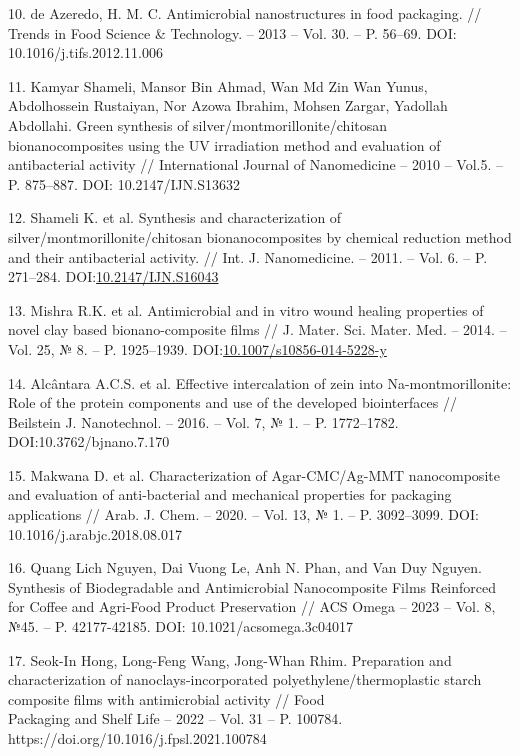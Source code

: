 \begin{references}
10. de Azeredo, H. M. C. Antimicrobial nanostructures in food packaging.
// Trends in Food Science \& Technology. -- 2013 -- Vol. 30. -- P.
56--69. DOI: 10.1016/j.tifs.2012.11.006

11. Kamyar Shameli, Mansor Bin Ahmad, Wan Md Zin Wan Yunus, Abdolhossein
Rustaiyan, Nor Azowa Ibrahim, Mohsen Zargar, Yadollah Abdollahi. Green
synthesis of silver/montmorillonite/chitosan \\bionanocomposites using
the UV irradiation method and evaluation of antibacterial activity //
International Journal of Nanomedicine -- 2010 -- Vol.5. -- P.
875--887. DOI: 10.2147/IJN.S13632

12. Shameli K. et al. Synthesis and characterization of
silver/montmorillonite/chitosan bionanocomposites by chemical
reduction method and their antibacterial activity. // Int. J.
Nanomedicine. -- 2011. -- Vol. 6. -- P. 271--284.
DOI:\href{http://dx.doi.org/10.2147/IJN.S16043}{10.2147/IJN.S16043}

13. Mishra R.K. et al. Antimicrobial and in vitro wound healing properties
of novel clay based bionano-composite films // J. Mater. Sci. Mater.
Med. -- 2014. -- Vol. 25, № 8. -- P. 1925--1939.
DOI:\href{http://dx.doi.org/10.1007/s10856-014-5228-y}{10.1007/s10856-014-5228-y}

14. Alcântara A.C.S. et al. Effective intercalation of zein into
Na-montmorillonite: Role of the protein components and use of the
developed biointerfaces // Beilstein J. Nanotechnol. -- 2016. -- Vol.
7, № 1. -- P. 1772--1782. DOI:10.3762/bjnano.7.170

15. Makwana D. et al. Characterization of Agar-CMC/Ag-MMT nanocomposite
and evaluation of anti-bacterial and mechanical properties for
packaging applications // Arab. J. Chem. -- 2020. -- Vol. 13, № 1. --
P. 3092--3099. DOI: 10.1016/j.arabjc.2018.08.017

16. Quang Lich Nguyen, Dai Vuong Le, Anh N. Phan, and Van Duy Nguyen.
Synthesis of Biodegradable and Antimicrobial Nanocomposite Films
Reinforced for Coffee and Agri-Food Product Preservation // ACS Omega
-- 2023 -- Vol. 8, №45. -- P. 42177-42185. DOI:
10.1021/acsomega.3c04017

17. Seok-In Hong, Long-Feng Wang, Jong-Whan Rhim. Preparation and
characterization of nanoclays-incorporated polyethylene/thermoplastic
starch composite films with antimicrobial activity // Food \\Packaging
and Shelf Life -- 2022 -- Vol. 31 -- P. 100784.
https://doi.org/10.1016/j.fpsl.2021.100784


\end{references}
